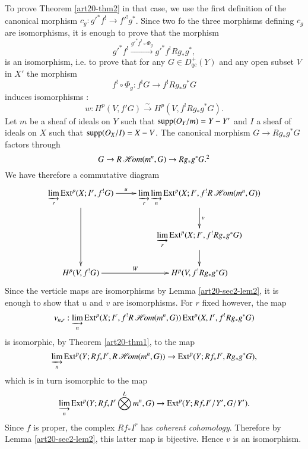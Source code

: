 To prove Theorem \ref{art20-thm2} in that case, we use the first definition of the canonical morphism $c_{g}:{g'}^{*}f^{!}\to {f'}^{!}g^{*}$. Since two fo the three morphisms defining $c_{g}$ are isomorphisms, it is enough to prove that the morphism
$$
{g'}^{*}f^{!}\xrightarrow{{g'}^{*}f^{!}\circ \Phi_{g}}{g'}^{*}f^{!}Rg_{*}g^{*},
$$
is an isomorphism, i.e. to prove that for any $G\in D^{+}_{qc}(Y)$ and any open subset $V$ in $X'$ the morphism
$$
f^{!}\circ \Phi_{g}:f^{!}G\to f^{!}Rg_{*}g^{*}G
$$
induces isomorphisms :
$$
w:H^{p}(V,{f'}G)\xrightarrow{\sim}H^{p}(V,f^{!}Rg_{*}g^{*}G).
$$
Let $m$ be a sheaf of ideals on $Y$ such that $\operatorname{\mathrm{supp}}(O_{Y}/m)=Y-Y'$ and $I$ a sheaf of ideals on $X$ such that $\operatorname{\mathrm{supp}}(O_{X}/I)=X-V$. The canonical morphism $G\to Rg_{*}g^{*}G$ factors through
$$
G\to R\scrHom(m^{n},G)\to Rg_{*}g^{*}G.\footnotemark[2]
$$
We have therefore a commutative diagram
\[
\xymatrix{
\varinjlim\limits_{r}\Ext^{p}(X;I^{r},f^{!}G)\ar[dd]\ar[r]^-{u} & \varinjlim\limits_{r}\varinjlim\limits_{n}\Ext^{p}(X;I^{r},f^{!}R\scrHom(m^{n},G))\ar[d]^-{v}\\
 & \varinjlim\limits_{r}\Ext^{p}(X;I^{r},f^{!}Rg_{*}g^{*}G)\ar[d]\\
H^{p}(V,f^{!}G)\ar[r]^-{W} & H^{p}(V,f^{!}Rg_{*}g^{*}G)
}
\]\pageoriginale
Since the verticle maps are isomorphisms by Lemma \ref{art20-sec2-lem2}, it is enough to show that $u$ and $v$ are isomorphisms. For $r$ fixed however, the map
$$
v_{n,r}:\varinjlim_{n}\operatorname{\mathrm{Ext}}^{p}(X;I^{r},f^{!}R\operatorname{\mathscr{H}\!\textit{om}}(m^{n},G))\operatorname{\mathrm{Ext}}^{p}(X,I^{r},f^{!}Rg_{*}g^{*}G)
$$
is isomorphic, by Theorem \ref{art20-thm1}, to the map
$$
\varinjlim_{n}\operatorname{\mathrm{Ext}}^{p}(Y;Rf_{*}I^{r},R\operatorname{\mathscr{H}\!\textit{om}}(m^{n},G))\to \operatorname{\mathrm{Ext}}^{p}(Y;Rf_{*}I^{r},Rg_{*}g^{*}G),
$$
which is in turn isomorphic to the map
$$
\varinjlim_{n}\operatorname{\mathrm{Ext}}^{p}(Y;Rf_{*}I^{r}\bigotimes\limits^{L}m^{n},G)\to \operatorname{\mathrm{Ext}}^{p}(Y;Rf_{*}I^{r}/Y',G/Y').
$$
Since $f$ is proper, the complex $Rf_{*}I^{r}$ has {\em coherent cohomology}. Therefore by Lemma \ref{art20-sec2-lem2}, this latter map is bijective. Hence $v$ is an isomorphism.

